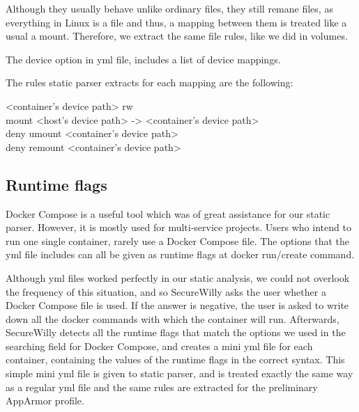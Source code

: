 Although they usually behave unlike ordinary files, they still remane files, as everything in Linux is a file and thus, a mapping between them is treated like a usual a mount. Therefore, we extract the same file rules, like we did in volumes.

The device option in yml file, includes a list of device mappings.

The rules static parser extracts for each mapping are the following:
\begin{description}
\item[\textless container's device path\textgreater{} rw]
\item[mount \textless host's device path\textgreater{} -\textgreater{} \textless container's device path\textgreater{}]
\item[deny umount \textless container's device path\textgreater{}]
\item[deny remount \textless container's device path\textgreater{}]
\end{description}

\subsection{Runtime flags}
Docker Compose is a useful tool which was of great assistance for our static parser. However, it is mostly used for multi-service projects. Users who intend to run one single container, rarely use a Docker Compose file. The options that the yml file includes can all be given as runtime flags at docker run/create command. 

Although yml files worked perfectly in our static analysis, we could not overlook the frequency of this situation, and so SecureWilly asks the user whether a Docker Compose file is used. If the answer is negative, the user is asked to write down all the docker commands with which the container will run. Afterwards, SecureWilly detects all the runtime flags that match the options we used in the searching field for Docker Compose, and creates a mini yml file for each container, containing the values of the runtime flags in the correct syntax. This simple mini yml file is given to static parser, and is treated exactly the same way as a regular yml file and the same rules are extracted for the preliminary AppArmor profile.

